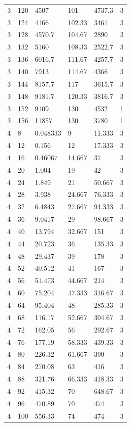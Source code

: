 \begin{tabular}{|p{0.6cm}|p{0.5cm}|p{1.15cm}|p{1cm}|p{1cm}|p{0.7cm}|}
3 & 120 & 4507 & 101 & 4737.3 & 3 \\
3 & 124 & 4166 & 102.33 & 3461 & 3 \\
3 & 128 & 4570.7 & 104.67 & 2890 & 3 \\
3 & 132 & 5160 & 108.33 & 2522.7 & 3 \\
3 & 136 & 6016.7 & 111.67 & 4257.7 & 3 \\
3 & 140 & 7913 & 114.67 & 4366 & 3 \\
3 & 144 & 8157.7 & 117 & 3615.7 & 3 \\
3 & 148 & 9181.7 & 120.33 & 3816.7 & 3 \\
3 & 152 & 9109 & 130 & 4532 & 1 \\
3 & 156 & 11857 & 130 & 3780 & 1 \\
4 & 8 & 0.048333 & 9 & 11.333 & 3 \\
4 & 12 & 0.156 & 12 & 17.333 & 3 \\
4 & 16 & 0.46067 & 14.667 & 37 & 3 \\
4 & 20 & 1.004 & 19 & 42 & 3 \\
4 & 24 & 1.849 & 21 & 50.667 & 3 \\
4 & 28 & 3.938 & 24.667 & 76.333 & 3 \\
4 & 32 & 6.4843 & 27.667 & 94.333 & 3 \\
4 & 36 & 9.0417 & 29 & 98.667 & 3 \\
4 & 40 & 13.794 & 32.667 & 151 & 3 \\
4 & 44 & 20.723 & 36 & 135.33 & 3 \\
4 & 48 & 29.437 & 39 & 178 & 3 \\
4 & 52 & 40.512 & 41 & 167 & 3 \\
4 & 56 & 51.473 & 44.667 & 214 & 3 \\
4 & 60 & 75.204 & 47.333 & 316.67 & 3 \\
4 & 64 & 95.404 & 48 & 285.33 & 3 \\
4 & 68 & 116.17 & 52.667 & 304.67 & 3 \\
4 & 72 & 162.05 & 56 & 292.67 & 3 \\
4 & 76 & 177.19 & 58.333 & 439.33 & 3 \\
4 & 80 & 226.32 & 61.667 & 390 & 3 \\
4 & 84 & 270.08 & 63 & 416 & 3 \\
4 & 88 & 321.76 & 66.333 & 418.33 & 3 \\
4 & 92 & 415.32 & 70 & 648.67 & 3 \\
4 & 96 & 470.89 & 70 & 474 & 3 \\
4 & 100 & 556.33 & 74 & 474 & 3 \\

\end{tabular}
